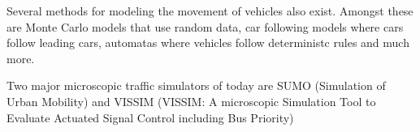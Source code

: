 Several methods for modeling the movement of vehicles also exist. Amongst these are Monte Carlo models \cite{} that use random data, car following models \cite{} where cars follow leading cars, automatas where vehicles follow deterministc rules \cite{} and much more.

Two major microscopic traffic simulators of today are SUMO (Simulation of Urban Mobility)\cite{sumo} and VISSIM (VISSIM: A microscopic Simulation Tool to Evaluate Actuated Signal Control including Bus Priority)








